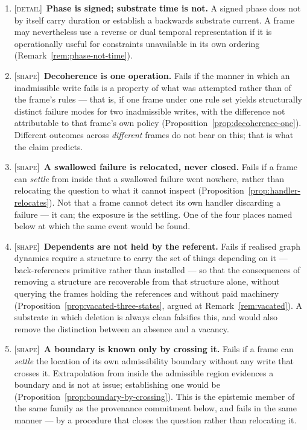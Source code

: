 \documentclass[11pt,a4paper]{article}
\theoremstyle{remark}\newtheorem{remark}[definition]{Remark}
\begin{document}
\begin{enumerate}[leftmargin=*]
\item \textsc{[detail]}~\textbf{Phase is signed; substrate time is not.} A signed phase does not by itself carry duration or establish a backwards substrate current. A frame may nevertheless use a reverse or dual temporal representation if it is operationally useful for constraints unavailable in its own ordering (Remark~\ref{rem:phase-not-time}).
\item \textsc{[shape]}~\textbf{Decoherence is one operation.} Fails if the manner in which an inadmissible write fails is a property of what was attempted rather than of the frame's rules --- that is, if one frame under one rule set yields structurally distinct failure modes for two inadmissible writes, with the difference not attributable to that frame's own policy (Proposition~\ref{prop:decoherence-one}). Different outcomes across \emph{different} frames do not bear on this; that is what the claim predicts.
\item \textsc{[shape]}~\textbf{A swallowed failure is relocated, never closed.} Fails if a frame can \emph{settle} from inside that a swallowed failure went nowhere, rather than relocating the question to what it cannot inspect (Proposition~\ref{prop:handler-relocates}). Not that a frame cannot detect its own handler discarding a failure --- it can; the exposure is the settling. One of the four places named below at which the same event would be found.
\item \textsc{[shape]}~\textbf{Dependents are not held by the referent.} Fails if realised graph dynamics require a structure to carry the set of things depending on it --- back-references primitive rather than installed --- so that the consequences of removing a structure are recoverable from that structure alone, without querying the frames holding the references and without paid machinery (Proposition~\ref{prop:vacated-three-states}, argued at Remark~\ref{rem:vacated}). A substrate in which deletion is always clean falsifies this, and would also remove the distinction between an absence and a vacancy.
\item \textsc{[shape]}~\textbf{A boundary is known only by crossing it.} Fails if a frame can \emph{settle} the location of its own admissibility boundary without any write that crosses it. Extrapolation from inside the admissible region evidences a boundary and is not at issue; establishing one would be (Proposition~\ref{prop:boundary-by-crossing}). This is the epistemic member of the same family as the provenance commitment below, and fails in the same manner --- by a procedure that closes the question rather than relocating it.

\end{enumerate}
\end{document}
